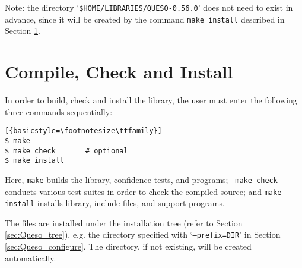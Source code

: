 Note: the directory `\verb+$HOME/LIBRARIES/QUESO-0.56.0+' does not need to exist in advance, since it will be created by the command \verb+make install+ described in Section \ref{sec:install_Queso_make}.


\section{Compile, Check and Install \Queso{}}\label{sec:install_Queso_make}
%
In order to build, check and install the library, the user must enter the following three commands sequentially:
\begin{lstlisting}[{basicstyle=\footnotesize\ttfamily}]
$ make
$ make check       # optional
$ make install 
\end{lstlisting}

Here, \verb+make+ builds the library, confidence tests, and programs;  \verb+ make check+ conducts various test suites in order to check the compiled source; and \verb+make install+ installs \Queso{} library, include files, and support programs.

The files are installed under the installation tree (refer to Section \ref{sec:Queso_tree}), e.g. the directory specified with `\texttt{--prefix=DIR}' in Section \ref{sec:Queso_configure}. The directory, if not existing, will be created automatically.%

% 
% 
% 
% 


